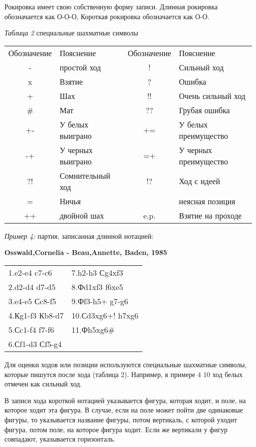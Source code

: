 Рокировка имеет свою собственную форму записи. Длинная рокировка обозначается как О-О-О, Короткая рокировка обозначается как О-О. 

\begin{center}
\emph{Таблица 2} специальные шахматные символы
\begin{tabular}{ c l c l }
Обозначение & Пояснение & Обозначение & Пояснение \\
- & простой ход & ! & Сильный ход \\
x & Взятие & ? & Ошибка \\
+ & Шах & !! & Очень сильный ход \\
\# & Мат & ?? & Грубая ошибка \\
+- & У белых выиграно & += & У белых преимущество \\
-+ & У черных выиграно & =+ &У черных преимущество \\
?! & Сомнительный ход & !? & Ход с идеей \\
= & Ничья & ~ & неясная позиция \\
++ & двойной шах & e.p. & Взятие на проходе \\
\end{tabular}
\end{center}

\emph{Пример 4:} партия, записанная длинной нотацией:
\begin{center} 
\textbf{Osswald,Cornelia - Beau,Annette, Baden, 1985}
\begin{tabular}{ l l }
1.e2-e4 c7-c6 & 7.h2-h3 Сg4xf3 \\
2.d2-d4 d7-d5 & 8.Фd1xf3 f6xe5 \\
3.e4-e5 Сc8-f5 & 9.Фf3-h5+ g7-g6 \\
4.Кg1-f3 Кb8-d7 & 10.Сd3xg6+! h7xg6 \\
5.Сc1-f4 f7-f6 & 11.Фh5xg6\# \\
6.Сf1-d3 Сf5-g4 & \\
\end{tabular}
\end{center}
 
Для оценки ходов или позиции используются специальные шахматные символы, которые пишутся после хода (таблица 2). Например, в примере 4 10 ход белых отмечен как сильный ход.

В записи хода короткой нотацией указывается фигура, которая ходит, и поле, на которое ходит эта фигура. В случае, если на поле может пойти две одинаковые фигуры, то указывается название фигуры, потом вертикаль, с которой уходит фигура, потом поле, на которое фигура ходит. Если же вертикали у фигур совпадают, указывается горизонталь.


